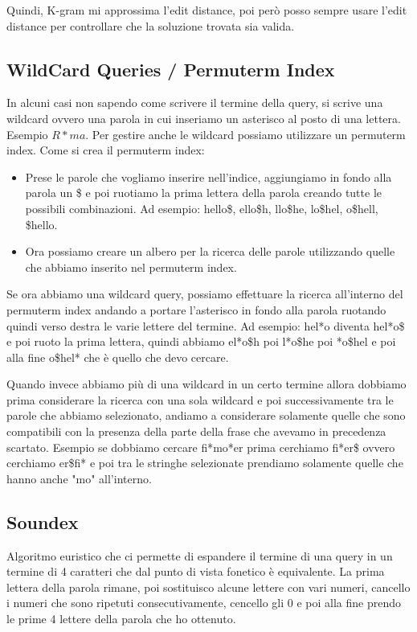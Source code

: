 \documentclass[14pt]{extreport}
\begin{document}
Quindi, K-gram mi approssima l'edit distance, poi però posso sempre usare l'edit distance per controllare che la soluzione trovata sia valida.

\subsection{WildCard Queries / Permuterm Index}

In alcuni casi non sapendo come scrivere il termine della query, si scrive una wildcard ovvero una parola in cui inseriamo un asterisco al posto di una lettera. Esempio $R*ma$.
Per gestire anche le wildcard possiamo utilizzare un permuterm index.
Come si crea il permuterm index:
\begin{itemize}
    \item Prese le parole che vogliamo inserire nell'indice, aggiungiamo in fondo alla parola un \$ e poi ruotiamo la prima lettera della parola creando tutte le possibili combinazioni. Ad esempio: hello\$, ello\$h, llo\$he, lo\$hel, o\$hell, \$hello.
    \item Ora possiamo creare un albero per la ricerca delle parole utilizzando quelle che abbiamo inserito nel permuterm index.
\end{itemize}

Se ora abbiamo una wildcard query, possiamo effettuare la ricerca all'interno del permuterm index andando a portare l'asterisco in fondo alla parola ruotando quindi verso destra le varie lettere del termine.
Ad esempio:
\newline
hel*o diventa hel*o\$ e poi ruoto la prima lettera, quindi abbiamo el*o\$h poi l*o\$he poi *o\$hel e poi alla fine o\$hel* che è quello che devo cercare.

Quando invece abbiamo più di una wildcard in un certo termine allora dobbiamo prima considerare la ricerca con una sola wildcard e poi successivamente tra le parole che abbiamo selezionato, andiamo a considerare solamente quelle che sono compatibili con la presenza della parte della frase che avevamo in precedenza scartato. Esempio se dobbiamo cercare fi*mo*er prima cerchiamo fi*er\$ ovvero cerchiamo er\$fi* e poi tra le stringhe selezionate prendiamo solamente quelle che hanno anche "mo" all'interno.

\subsection{Soundex}

Algoritmo euristico che ci permette di espandere il termine di una query in un termine di 4 caratteri che dal punto di vista fonetico è equivalente.
La prima lettera della parola rimane, poi sostituisco alcune lettere con vari numeri, cancello i numeri che sono ripetuti consecutivamente, cencello gli 0 e poi alla fine prendo le prime 4 lettere della parola che ho ottenuto. 
\end{document}
